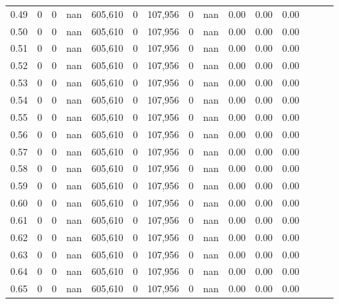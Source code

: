 \begin{tabular}{rrrrrrrrrrrrrrr}
0.49 &       0 &      0 &   nan &  605,610 &        0 &  107,956 &        0 &   nan &  0.00 &  0.00 &      0.00 \\
0.50 &       0 &      0 &   nan &  605,610 &        0 &  107,956 &        0 &   nan &  0.00 &  0.00 &      0.00 \\
0.51 &       0 &      0 &   nan &  605,610 &        0 &  107,956 &        0 &   nan &  0.00 &  0.00 &      0.00 \\
0.52 &       0 &      0 &   nan &  605,610 &        0 &  107,956 &        0 &   nan &  0.00 &  0.00 &      0.00 \\
0.53 &       0 &      0 &   nan &  605,610 &        0 &  107,956 &        0 &   nan &  0.00 &  0.00 &      0.00 \\
0.54 &       0 &      0 &   nan &  605,610 &        0 &  107,956 &        0 &   nan &  0.00 &  0.00 &      0.00 \\
0.55 &       0 &      0 &   nan &  605,610 &        0 &  107,956 &        0 &   nan &  0.00 &  0.00 &      0.00 \\
0.56 &       0 &      0 &   nan &  605,610 &        0 &  107,956 &        0 &   nan &  0.00 &  0.00 &      0.00 \\
0.57 &       0 &      0 &   nan &  605,610 &        0 &  107,956 &        0 &   nan &  0.00 &  0.00 &      0.00 \\
0.58 &       0 &      0 &   nan &  605,610 &        0 &  107,956 &        0 &   nan &  0.00 &  0.00 &      0.00 \\
0.59 &       0 &      0 &   nan &  605,610 &        0 &  107,956 &        0 &   nan &  0.00 &  0.00 &      0.00 \\
0.60 &       0 &      0 &   nan &  605,610 &        0 &  107,956 &        0 &   nan &  0.00 &  0.00 &      0.00 \\
0.61 &       0 &      0 &   nan &  605,610 &        0 &  107,956 &        0 &   nan &  0.00 &  0.00 &      0.00 \\
0.62 &       0 &      0 &   nan &  605,610 &        0 &  107,956 &        0 &   nan &  0.00 &  0.00 &      0.00 \\
0.63 &       0 &      0 &   nan &  605,610 &        0 &  107,956 &        0 &   nan &  0.00 &  0.00 &      0.00 \\
0.64 &       0 &      0 &   nan &  605,610 &        0 &  107,956 &        0 &   nan &  0.00 &  0.00 &      0.00 \\
0.65 &       0 &      0 &   nan &  605,610 &        0 &  107,956 &        0 &   nan &  0.00 &  0.00 &      0.00 \\

\end{tabular}

